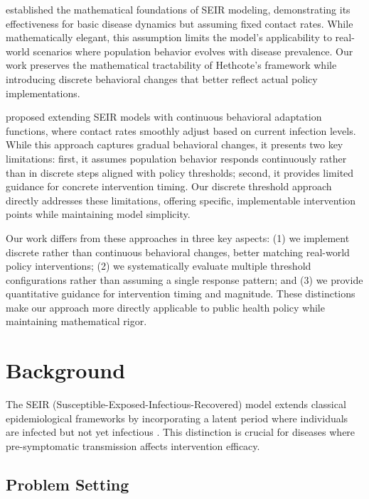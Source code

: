 \documentclass{article} %
\begin{document}
\citet{hethcote2000mathematics} established the mathematical foundations of SEIR modeling, demonstrating its effectiveness for basic disease dynamics but assuming fixed contact rates. While mathematically elegant, this assumption limits the model's applicability to real-world scenarios where population behavior evolves with disease prevalence. Our work preserves the mathematical tractability of Hethcote's framework while introducing discrete behavioral changes that better reflect actual policy implementations.

\citet{he2020seir} proposed extending SEIR models with continuous behavioral adaptation functions, where contact rates smoothly adjust based on current infection levels. While this approach captures gradual behavioral changes, it presents two key limitations: first, it assumes population behavior responds continuously rather than in discrete steps aligned with policy thresholds; second, it provides limited guidance for concrete intervention timing. Our discrete threshold approach directly addresses these limitations, offering specific, implementable intervention points while maintaining model simplicity.

Our work differs from these approaches in three key aspects: (1) we implement discrete rather than continuous behavioral changes, better matching real-world policy interventions; (2) we systematically evaluate multiple threshold configurations rather than assuming a single response pattern; and (3) we provide quantitative guidance for intervention timing and magnitude. These distinctions make our approach more directly applicable to public health policy while maintaining mathematical rigor.

\section{Background}
\label{sec:background}

The SEIR (Susceptible-Exposed-Infectious-Recovered) model extends classical epidemiological frameworks by incorporating a latent period where individuals are infected but not yet infectious \citep{hethcote2000mathematics}. This distinction is crucial for diseases where pre-symptomatic transmission affects intervention efficacy.

\subsection{Problem Setting}
\label{subsec:problem}
\end{document}
